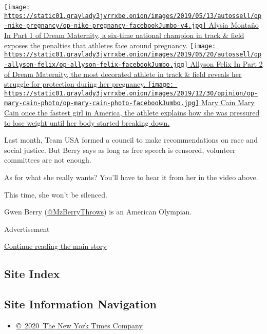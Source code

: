 \href{https://www.nytimes3xbfgragh.onion/2019/05/12/opinion/nike-maternity-leave.html}{\texttt{[image: https://static01.graylady3jvrrxbe.onion/images/2019/05/13/autossell/op-nike-pregnancy/op-nike-pregnancy-facebookJumbo-v4.jpg]}
Alysia Montaño In Part 1 of Dream Maternity, a six-time national
champion in track \& field exposes the penalties that athletes face
around pregnancy.}
\href{https://www.nytimes3xbfgragh.onion/2019/05/22/opinion/allyson-felix-pregnancy-nike.html}{\texttt{[image: https://static01.graylady3jvrrxbe.onion/images/2019/05/20/autossell/op-allyson-felix/op-allyson-felix-facebookJumbo.jpg]}
Allyson Felix In Part 2 of Dream Maternity, the most decorated athlete
in track \& field reveals her struggle for protection during her
pregnancy. }
\href{https://www.nytimes3xbfgragh.onion/2019/11/07/opinion/nike-running-mary-cain.html}{\texttt{[image: https://static01.graylady3jvrrxbe.onion/images/2019/12/30/opinion/op-mary-cain-photo/op-mary-cain-photo-facebookJumbo.jpg]}
Mary Cain Mary Cain once the fastest girl in America, the athlete
explains how she was pressured to lose weight until her body started
breaking down. }

Last month, Team USA formed a council to make recommendations on race
and social justice. But Berry says as long as free speech is censored,
volunteer committees are not enough.

As for what she really wants? You'll have to hear it from her in the
video above.

This time, she won't be silenced.

Gwen Berry (\href{https://twitter.com/mzberrythrows}{@MzBerryThrows}) is
an American Olympian.

Advertisement

\protect\hyperlink{after-bottom}{Continue reading the main story}

\hypertarget{site-index}{%
\subsection{Site Index}\label{site-index}}

\hypertarget{site-information-navigation}{%
\subsection{Site Information
Navigation}\label{site-information-navigation}}

\begin{itemize}
\tightlist
\item
  \href{https://help.nytimes3xbfgragh.onion/hc/en-us/articles/115014792127-Copyright-notice}{©~2020~The
  New York Times Company}
\end{itemize}

